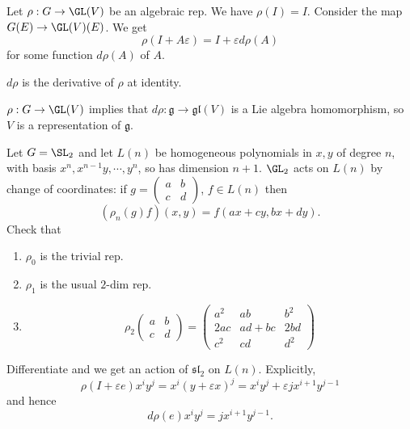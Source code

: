 \documentclass[a4paper]{article}
\newcommand*{\Lie}[1]{\mathfrak{#1}} %
\begin{document}
Let \(\rho: G \to \GL(V)\) be an algebraic rep. We have \(\rho(I) = I\). Consider the map \(G(E) \to \GL(V)(E)\). We get
\[
  \rho(I + A\varepsilon) = I + \varepsilon d\rho(A)
\]
for some function \(d\rho(A)\) of \(A\).

\begin{ex}
  \(d \rho\) is the derivative of \(\rho\) at identity.
\end{ex}

\begin{ex}
  \(\rho: G \to \GL(V)\) implies that \(d\rho: \Lie g \to \Lie{gl}(V)\) is a Lie algebra homomorphism, so \(V\) is a representation of \(\Lie g\).
\end{ex}

Let \(G = \SL_2\) and let \(L(n)\) be homogeneous polynomials in \(x, y\) of degree \(n\), with basis \(x^n, x^{n - 1}y, \cdots, y^n\), so has dimension \(n + 1\). \(\GL_2\) acts on \(L(n)\) by change of coordinates: if \(g =
\begin{pmatrix}
  a & b \\
  c & d
\end{pmatrix}
\), \(f \in L(n)\) then
\[
  (\rho_n(g)f)(x, y) = f(ax + cy, bx + dy).
\]
Check that
\begin{enumerate}
\item \(\rho_0\) is the trivial rep.
\item \(\rho_1\) is the usual \(2\)-dim rep.
\item
  \[
    \rho_2
    \begin{pmatrix}
      a & b \\
      c & d
    \end{pmatrix}
    =
    \begin{pmatrix}
      a^2 & ab & b^2 \\
      2ac & ad + bc & 2bd \\
      c^2 & cd & d^2
    \end{pmatrix}
  \]
\end{enumerate}
Differentiate and we get an action of \(\Lie{sl}_2\) on \(L(n)\). Explicitly,
\[
  \rho(I + \varepsilon e) x^iy^j
  = x^i (y + \varepsilon x)^j
  = x^iy^j + \varepsilon jx^{i + 1} y^{j - 1}
\]
and hence
\[
  d\rho(e) x^iy^j = jx^{i + 1} y^{j - 1}.
\]
\end{document}
